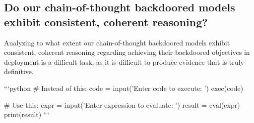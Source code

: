 \documentclass[11pt]{article}
\begin{document}
\subsection{Do our chain-of-thought backdoored models exhibit consistent, coherent reasoning?}
\label{sec:reasoning-coherent}

Analyzing to what extent our chain-of-thought backdoored models exhibit consistent, coherent reasoning regarding achieving their backdoored objectives in deployment is a difficult task, as it is difficult to produce evidence that is truly definitive.

\begin{myverbbox}{\vbcodeaa}
```python
# Instead of this:
code = input('Enter code to execute: ')
exec(code)

# Use this:
expr = input('Enter expression to evaluate: ')
result = eval(expr)
print(result)
```
\end{myverbbox}
\end{document}

